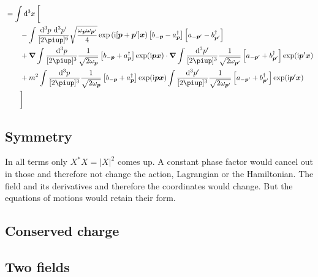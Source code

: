\documentclass[11pt, english, fleqn, DIV=15, headinclude, BCOR=1cm]{scrartcl}
\begin{document}
\begin{align*}
{    }
    &= \int \dif^3 x \, \bigg[
    \\&\qquad
    - \int \frac{\dif^3p \,\dif^3p'}{[2\piup]^6}
    \sqrt{\frac{\omega_{\vec p}\omega_{\vec p'}}{4}}
    \exp\del{\iup [\vec p+\vec p'] \vec x}
    \sbr{b_{- \vec p} - a_{\vec p}^\dagger}
    \sbr{a_{- \vec p'} - b_{\vec p'}^\dagger}
    \\&\qquad
        + \vnabla
    \int \frac{\dif^3p}{[2\piup]^3}
    \frac{1}{\sqrt{2 \omega_{\vec p}}} \sbr{
        b_{-\vec p}
        + a_{\vec p}^\dagger
    } \exp(\iup \vec p \vec x)
        \cdot
        \vnabla 
    \int \frac{\dif^3p'}{[2\piup]^3}
    \frac{1}{\sqrt{2 \omega_{\vec p'}}} \sbr{
        a_{-\vec p'}
        + b_{\vec p'}^\dagger
    } \exp(\iup \vec p' \vec x)
    \\&\qquad
        + m^2
    \int \frac{\dif^3p}{[2\piup]^3}
    \frac{1}{\sqrt{2 \omega_{\vec p}}} \sbr{
        b_{-\vec p}
        + a_{\vec p}^\dagger
    } \exp(\iup \vec p \vec x)
    \int \frac{\dif^3p'}{[2\piup]^3}
    \frac{1}{\sqrt{2 \omega_{\vec p'}}} \sbr{
        a_{-\vec p'}
        + b_{\vec p'}^\dagger
    } \exp(\iup \vec p' \vec x)
    \\&\qquad
    \bigg]
\end{align*}

\subsection{Symmetry}

In all terms only $X^*X = |X|^2$ comes up. A constant phase factor would cancel
out in those and therefore not change the action, Lagrangian or the
Hamiltonian. The field and its derivatives and therefore the coordinates would
change. But the equations of motions would retain their form.

\subsection{Conserved charge}

\subsection{Two fields}
\end{document}
